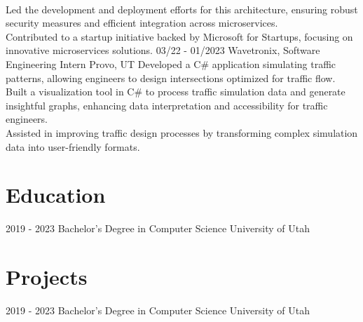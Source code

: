 \documentclass[]{friggeri-cv}
\begin{document}
\begin{entrylist}
{    \\Led the development and deployment efforts for this architecture, ensuring robust security measures and efficient integration across microservices.
    \\Contributed to a startup initiative backed by Microsoft for Startups, focusing on innovative microservices solutions.
    }
  \entry
    {03/22 - 01/2023}
    {Wavetronix, Software Engineering Intern}
    {Provo, UT}
    {Developed a C\# application simulating traffic patterns, allowing engineers to design intersections optimized for traffic flow.
    \\Built a visualization tool in C\# to process traffic simulation data and generate insightful graphs, enhancing data interpretation and accessibility for traffic engineers.
    \\Assisted in improving traffic design processes by transforming complex simulation data into user-friendly formats.
    }
\end{entrylist}

\section{Education}
\begin{entrylist}
  \entry
    {2019 - 2023}
    {Bachelor's Degree in Computer Science}
    {University of Utah}
    {}
\end{entrylist}

\section{Projects}
\begin{entrylist}
  \entry
    {2019 - 2023}
    {Bachelor's Degree in Computer Science}
    {University of Utah}
    {}
\end{entrylist}
\end{document}
